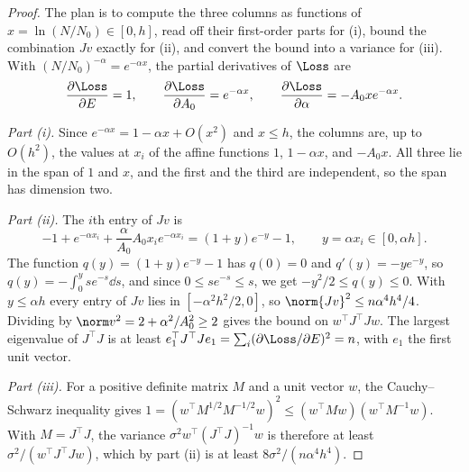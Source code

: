 \begin{refsection}
\begin{proof}
The plan is to compute the three columns as functions of $x=\ln(N/N_0)\in[0,h]$, read off their first-order parts for (i), bound the combination $Jv$ exactly for (ii), and convert the bound into a variance for (iii). With $(N/N_0)^{-\alpha}=e^{-\alpha x}$, the partial derivatives of $\Loss$ are
\[
\frac{\partial\Loss}{\partial E}=1,\qquad\frac{\partial\Loss}{\partial A_0}=e^{-\alpha x},\qquad\frac{\partial\Loss}{\partial\alpha}=-A_0xe^{-\alpha x}.
\]

\emph{Part (i).} Since $e^{-\alpha x}=1-\alpha x+O(x^2)$ and $x\le h$, the columns are, up to $O(h^2)$, the values at $x_i$ of the affine functions $1$, $1-\alpha x$, and $-A_0x$. All three lie in the span of $1$ and $x$, and the first and the third are independent, so the span has dimension two.

\emph{Part (ii).} The $i$th entry of $Jv$ is
\[
-1+e^{-\alpha x_i}+\frac\alpha{A_0}A_0x_ie^{-\alpha x_i}=(1+y)e^{-y}-1,\qquad y=\alpha x_i\in[0,\alpha h].
\]
The function $q(y)=(1+y)e^{-y}-1$ has $q(0)=0$ and $q'(y)=-ye^{-y}$, so $q(y)=-\int_0^yse^{-s}\dd s$, and since $0\le se^{-s}\le s$, we get $-y^2/2\le q(y)\le0$. With $y\le\alpha h$ every entry of $Jv$ lies in $[-\alpha^2h^2/2,0]$, so $\norm{Jv}^2\le n\alpha^4h^4/4$. Dividing by $\norm v^2=2+\alpha^2/A_0^2\ge2$ gives the bound on $w^\top J^\top Jw$. The largest eigenvalue of $J^\top J$ is at least $e_1^\top J^\top Je_1=\sum_i(\partial\Loss/\partial E)^2=n$, with $e_1$ the first unit vector.

\emph{Part (iii).} For a positive definite matrix $M$ and a unit vector $w$, the Cauchy--Schwarz inequality gives $1=(w^\top M^{1/2}M^{-1/2}w)^2\le(w^\top Mw)(w^\top M^{-1}w)$. With $M=J^\top J$, the variance $\sigma^2w^\top(J^\top J)^{-1}w$ is therefore at least $\sigma^2/(w^\top J^\top Jw)$, which by part (ii) is at least $8\sigma^2/(n\alpha^4h^4)$.
\end{proof}


\end{refsection}
